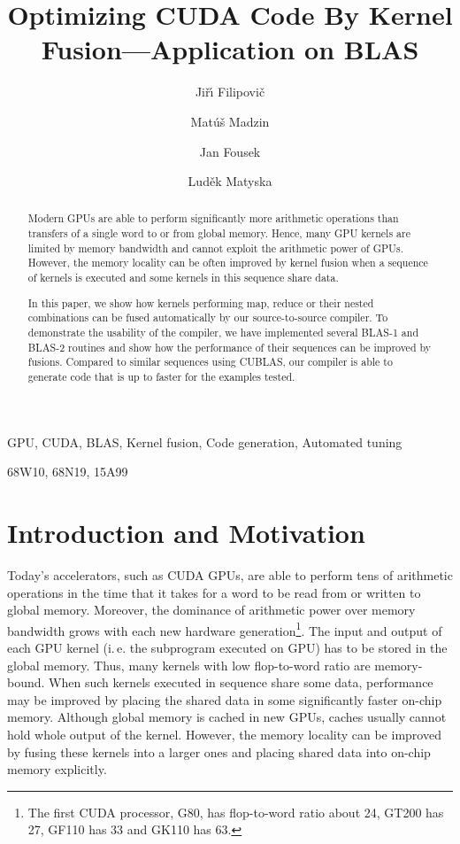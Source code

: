 \documentclass[final]{siamltex}
\title{Optimizing CUDA Code By Kernel Fusion---Application on BLAS}
\author{Ji\v{r}\'{\i} Filipovi\v{c}\footnotemark[2]
\and Mat\'{u}\v{s} Madzin\footnotemark[3]
\and Jan Fousek\footnotemark[3]
\and Lud\v{e}k Matyska\footnotemark[2]}
\def\ie{i.\,e.}
\begin{document}
\maketitle


\begin{abstract}

Modern GPUs are able to perform significantly more arithmetic operations than transfers of a single word to or from global memory. Hence, many GPU kernels are limited by memory bandwidth and cannot exploit the arithmetic power of GPUs. However, the memory locality can be often improved by kernel fusion when a sequence of kernels is executed and some kernels in this sequence share data.

In this paper, we show how kernels performing map, reduce or their nested combinations can be fused automatically by our source-to-source compiler. To demonstrate the usability of the compiler, we have implemented several BLAS-1 and BLAS-2 routines and show how the performance of their sequences can be improved by fusions. Compared to similar sequences using CUBLAS, our compiler is able to generate code that is up to  faster for the examples tested. 

\end{abstract}

\begin{keywords}
GPU, CUDA, BLAS, Kernel fusion, Code generation, Automated tuning
\end{keywords}

\begin{AMS}
68W10, 68N19, 15A99
\end{AMS}

\section{Introduction and Motivation}

Today's accelerators, such as CUDA GPUs, are able to perform tens of arithmetic operations in the time that it takes for a word to be read from or written to global memory. Moreover, the dominance of arithmetic power over memory bandwidth grows with each new hardware generation\footnote{The first CUDA processor, G80, has flop-to-word ratio about 24, GT200 has 27, GF110 has 33 and GK110 has 63.}. The input and output of each GPU kernel (\ie{} the subprogram executed on GPU) has to be stored in the global memory. Thus, many kernels  with low flop-to-word ratio are memory-bound. When such kernels executed in sequence share some data, performance may be improved by placing the shared data in some significantly faster on-chip memory. Although global memory is cached in new GPUs, caches usually cannot hold whole output of the kernel. However, the memory locality can be improved by fusing these kernels into a larger ones and placing shared data into on-chip memory explicitly.
\end{document}
